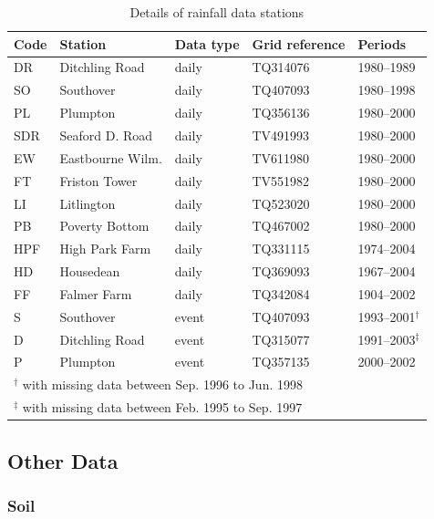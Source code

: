 \begin{table}[htbp]
  \centering
  \caption{Details of rainfall data stations}
  \label{tab:DetailsOfDataStations}
    \small
    \begin{tabular}{lllll}
      \toprule
      \textbf{Code} & \textbf{Station} & \textbf{Data type} &
\textbf{Grid reference} & \textbf{Periods}\\
      \midrule
      DR & Ditchling Road & daily & TQ314076 & 1980--1989\\
      SO & Southover & daily & TQ407093 & 1980--1998\\
      PL & Plumpton & daily & TQ356136 & 1980--2000\\
      SDR & Seaford D. Road & daily & TV491993 & 1980--2000\\
      EW & Eastbourne Wilm. & daily & TV611980 & 1980--2000\\
      FT & Friston Tower & daily & TV551982 & 1980--2000\\
      LI & Litlington & daily & TQ523020 & 1980--2000\\
      PB & Poverty Bottom & daily & TQ467002 & 1980--2000\\
      HPF & High Park Farm & daily & TQ331115 & 1974--2004\\
      HD & Housedean & daily & TQ369093 & 1967--2004\\
      FF & Falmer Farm & daily & TQ342084 & 1904--2002\\
      S & Southover & event & TQ407093 &
1993--2001$^\dagger$\\
      D & Ditchling Road & event & TQ315077 &
1991--2003$^\ddagger$\\
      P & Plumpton & event & TQ357135 & 2000--2002\\
      \bottomrule
      \multicolumn{5}{l}{\footnotesize $^\dagger$  with
missing data between Sep. 1996 to Jun. 1998}\\
      \multicolumn{5}{l}{\footnotesize $^\ddagger$  with
missing data between Feb. 1995 to Sep. 1997}
    \end{tabular}
\end{table}

\subsection{Other Data}
\label{sec:OtherData}

\subsubsection{Soil}
\label{sec:Soil}

